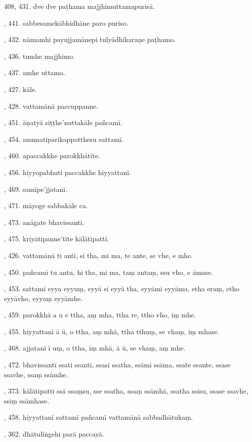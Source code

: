 408, 431. dve dve paṭhama majjhimuttamapurisā.\par {}, 441. sabbesamekābhidhāne paro puriso.\par {}, 432. nāmamhi payujjamānepi tulyādhikaraṇe paṭhamo.\par {}, 436. tumhe majjhimo.\par {}, 437. amhe uttamo.\par {}, 427. kāle.\par {}, 428. vattamānā paccuppanne.\par {}, 451. āṇatyā siṭṭhe’nuttakāle pañcamī.\par {}, 454. anumatiparikappatthesu sattamī.\par {}, 460. apaccakkhe parokkhātīte.\par {}, 456. hiyyopabhuti paccakkhe hiyyattanī.\par {}, 469. samīpe’jjatanī.\par {}, 471. māyoge sabbakāle ca.\par {}, 473. anāgate bhavissantī.\par {}, 475. kriyātipanne’tīte kālātipatti.\par {}, 426. vattamānā ti anti, si tha, mi ma, te ante, se vhe, e mhe.\par {}, 450. pañcamī tu antu, hi tha, mi ma, taṃ antaṃ, ssu vho, e āmase.\par {}, 453. sattamī eyya eyyuṃ, eyyā si eyyā tha, eyyāmi eyyāma, etha eraṃ, etho eyyāvho, eyyaṃ eyyāmhe.\par {}, 459. parokkhā a u e ttha, aṃ mha, ttha re, ttho vho, iṃ mhe.\par {}, 455. hiyyattanī ā ū, o ttha, aṃ mhā, ttha tthuṃ, se vhaṃ, iṃ mhase.\par {}, 468. ajjatanī ī uṃ, o ttha, iṃ mhā, ā ū, se vhaṃ, aṃ mhe.\par {}, 472. bhavissantī ssati ssanti, ssasi ssatha, ssāmi ssāma, ssate ssante, ssase ssavhe, ssaṃ ssāmhe.\par {}, 373. kālātipatti ssā ssaṃsu, sse ssatha, ssaṃ ssāmhā, ssatha ssisu, ssase ssavhe, ssiṃ ssāmhase.\par {}, 458. hiyyattanī sattamī pañcamī vattamānā sabbadhātukaṃ.\par {}, 362. dhātuliṅgehi parā paccayā.\par \noindent
